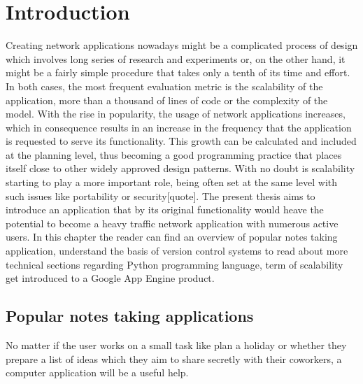 \chapter{Introduction}
\label{sec:Introduction}
Creating network applications nowadays might be a complicated process of design which involves long series of research and experiments or, on the other hand, it might be a fairly simple procedure that takes only a tenth of its time and effort. In both cases, the most frequent evaluation metric is the scalability of the application, more than a thousand of lines of code or the complexity of the model. With the rise in popularity, the usage of network applications increases, which in consequence results in an increase in the frequency that the application is requested to serve its functionality. This growth can be calculated and included at the planning level, thus becoming a good programming practice that places itself close to other widely approved design patterns. With no doubt is scalability starting to play a more important role, being often set at the same level with such issues like portability or security[quote]. The present thesis aims to introduce an application that by its original functionality would heave the potential to become a heavy traffic network application with numerous active users. In this chapter the reader can find an overview of popular notes taking application, understand the basis of version control systems to read about more technical sections regarding Python programming language, term of scalability get introduced to a Google App Engine product.

\section{Popular notes taking applications}\label{sec:popular_apps} 
No matter if the user works on a small task like plan a holiday or whether they prepare a list of ideas which they aim to share secretly with their coworkers, a computer application will be a useful help.     

